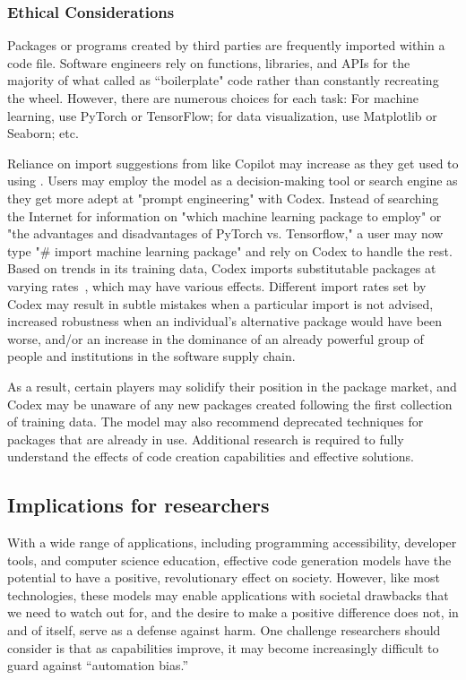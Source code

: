 \subsubsection{Ethical Considerations}
\label{ethics}
Packages or programs created by third parties are frequently imported within a code file. Software engineers rely on functions, libraries, and APIs for the majority of what called as ``boilerplate" code rather than constantly recreating the wheel. 
However, there are numerous choices for each task: For machine learning, use PyTorch or TensorFlow; for data visualization, use Matplotlib or Seaborn; etc.

Reliance on import suggestions from \cct{} like Copilot may increase as they get used to using \cct{}. 
Users may employ the model as a decision-making tool or search engine as they get more adept at "prompt engineering" with Codex. 
Instead of searching the Internet for information on "which machine learning package to employ" or "the advantages and disadvantages of PyTorch vs. Tensorflow," a user may now type "\# import machine learning package" and rely on Codex to handle the rest.
Based on trends in its training data, Codex imports substitutable packages at varying rates~\cite{copilot}, which may have various effects. 
Different import rates set by Codex may result in subtle mistakes when a particular import is not advised, increased robustness when an individual's alternative package would have been worse, and/or an increase in the dominance of an already powerful group of people and institutions in the software supply chain.

As a result, certain players may solidify their position in the package market, and Codex may be unaware of any new packages created following the first collection of training data. The model may also recommend deprecated techniques for packages that are already in use. Additional research is required to fully understand the effects of code creation capabilities and effective solutions.


\subsection{Implications for researchers}
With a wide range of applications, including programming accessibility, developer tools, and computer science education, effective code generation models have the potential to have a positive, revolutionary effect on society. 
However, like most technologies, these models may enable applications with societal drawbacks that we need to watch out for, and the desire to make a positive difference does not, in and of itself, serve as a defense against harm.
One challenge researchers should consider is that as capabilities improve, it may become increasingly difficult to guard against “automation bias.”

